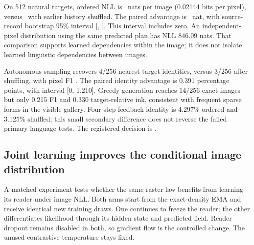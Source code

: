 On 512 natural targets, ordered NLL is \DensityNll\ nats per image
(0.02144 bits per pixel), versus \DensityShuffledNll\ with earlier history
shuffled. The paired advantage is \DensityAdvantage\ nat, with source-record
bootstrap 95\% interval [\DensityLow, \DensityHigh]. This interval includes
zero. An independent-pixel distribution using the same predicted plan has NLL
846.09 nats. That comparison supports learned dependencies within the image;
it does not isolate learned linguistic dependencies between images.

Autonomous sampling recovers 4/256 nearest target identities, versus 3/256
after shuffling, with pixel F1 \DensityFone. The paired identity advantage is
0.391 percentage points, with interval [0, 1.210]. Greedy generation reaches
14/256 exact images but only 0.215 F1 and 0.330 target-relative ink, consistent
with frequent sparse forms in the visible gallery. Four-step feedback identity
is 4.297\% ordered and 3.125\% shuffled; this small secondary difference does
not reverse the failed primary language tests. The registered decision is
\texttt{\DensityDecision}.


\subsection*{Joint learning improves the conditional image distribution}
A matched experiment tests whether the same raster law benefits from learning
its reader under image NLL. Both arms start from the exact-density EMA and
receive identical new training draws. One continues to freeze the reader;
the other differentiates likelihood through its hidden state and predicted
field. Reader dropout remains disabled in both, so gradient flow is the
controlled change. The unused contrastive temperature stays fixed.

